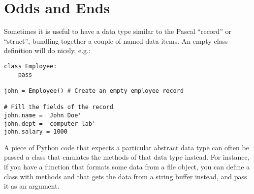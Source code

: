 \documentclass{manual}
\begin{document}

\section{Odds and Ends}
\label{odds}

Sometimes it is useful to have a data type similar to the Pascal
``record'' or \C{} ``struct'', bundling together a couple of named data
items.  An empty class definition will do nicely, e.g.:

\begin{verbatim}
class Employee:
    pass

john = Employee() # Create an empty employee record

# Fill the fields of the record
john.name = 'John Doe'
john.dept = 'computer lab'
john.salary = 1000
\end{verbatim}


A piece of Python code that expects a particular abstract data type
can often be passed a class that emulates the methods of that data
type instead.  For instance, if you have a function that formats some
data from a file object, you can define a class with methods
 and  that gets the data from a string
buffer instead, and pass it as an argument.%
\end{document}
